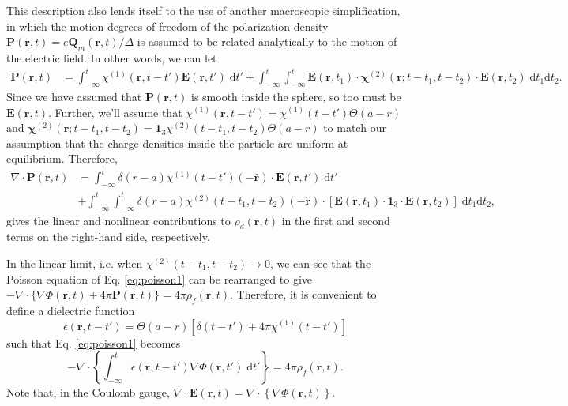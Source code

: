 \documentclass{article}
\begin{document}
This description also lends itself to the use of another macroscopic simplification, in which the motion degrees of freedom of the polarization density $\mathbf{P}(\mathbf{r},t) = e\mathbf{Q}_m(\mathbf{r},t)/\Delta$ is assumed to be related analytically to the motion of the electric field. In other words, we can let
\begin{equation}\label{eq:suscDef}
\begin{split}
\mathbf{P}(\mathbf{r},t) &= \int_{-\infty}^t\chi^{(1)}(\mathbf{r},t-t')\mathbf{E}(\mathbf{r},t')\;\mathrm{d}t' + \int_{-\infty}^t\int_{-\infty}^t\mathbf{E}(\mathbf{r},t_1)\cdot\bm{\chi}^{(2)}(\mathbf{r};t - t_1,t - t_2)\cdot\mathbf{E}(\mathbf{r},t_2)\;\mathrm{d}t_1\mathrm{d}t_2.
\end{split}
\end{equation}
Since we have assumed that $\mathbf{P}(\mathbf{r},t)$ is smooth inside the sphere, so too must be $\mathbf{E}(\mathbf{r},t)$. Further, we'll assume that $\chi^{(1)}(\mathbf{r},t - t') = \chi^{(1)}(t - t')\Theta(a - r)$ and $\bm{\chi}^{(2)}(\mathbf{r};t - t_1,t - t_2) = \bm{1}_3\chi^{(2)}(t - t_1,t - t_2)\Theta(a - r)$ to match our assumption that the charge densities inside the particle are uniform at equilibrium. Therefore,
\begin{equation}
\begin{split}
\nabla\cdot\mathbf{P}(\mathbf{r},t) &= \int_{-\infty}^t\delta(r - a)\chi^{(1)}(t - t')(-\hat{\mathbf{r}})\cdot\mathbf{E}(\mathbf{r},t')\;\mathrm{d}t'\\
&+ \int_{-\infty}^t\int_{-\infty}^t\delta(r - a)\chi^{(2)}(t - t_1,t - t_2)(-\hat{\mathbf{r}})\cdot\left[\mathbf{E}(\mathbf{r},t_1)\cdot\bm{1}_3\cdot\mathbf{E}(\mathbf{r},t_2)\right]\;\mathrm{d}t_1\mathrm{d}t_2,
\end{split}
\end{equation}
gives the linear and nonlinear contributions to $\rho_d(\mathbf{r},t)$ in the first and second terms on the right-hand side, respectively. 

In the linear limit, i.e. when $\chi^{(2)}(t- t_1,t - t_2)\to0$, we can see that the Poisson equation of Eq. \eqref{eq:poisson1} can be rearranged to give $-\nabla\cdot\{\nabla\Phi(\mathbf{r},t) + 4\pi\mathbf{P}(\mathbf{r},t)\} = 4\pi\rho_f(\mathbf{r},t)$. Therefore, it is convenient to define a dielectric function
\begin{equation}
\epsilon(\mathbf{r},t - t') = \Theta(a - r)\left[\delta(t - t') + 4\pi\chi^{(1)}(t - t')\right]
\end{equation}
such that Eq. \eqref{eq:poisson1} becomes
\begin{equation}
-\nabla\cdot\left\{\int_{-\infty}^t\epsilon(\mathbf{r},t - t')\nabla\Phi(\mathbf{r},t')\;\mathrm{d}t'\right\} = 4\pi\rho_f(\mathbf{r},t).
\end{equation}
Note that, in the Coulomb gauge, $\nabla\cdot\mathbf{E}(\mathbf{r},t) = \nabla\cdot\left\{\nabla\Phi(\mathbf{r},t)\right\}$.
\end{document}
